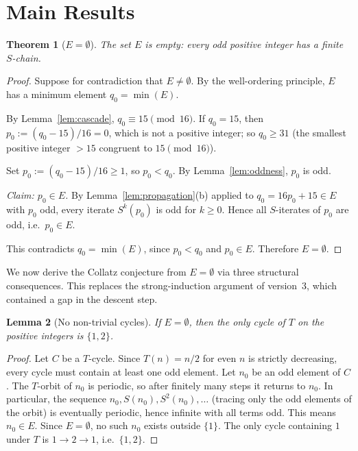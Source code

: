 \documentclass{amsart}
\newtheorem{theorem}{Theorem}[section]
\newtheorem{lemma}[theorem]{Lemma}
\theoremstyle{definition}
\theoremstyle{remark}
\begin{document}
\section{Main Results}
\label{sec:main}

\begin{theorem}[$E=\emptyset$]
\label{thm:empty}
The set $E$ is empty: every odd positive integer has a finite $S$-chain.
\end{theorem}

\begin{proof}
Suppose for contradiction that $E\ne\emptyset$.
By the well-ordering principle, $E$ has a minimum element
$q_0=\min(E)$.

By Lemma~\ref{lem:cascade}, $q_0\equiv 15\pmod{16}$.
If $q_0=15$, then $p_0:=(q_0-15)/16=0$, which is not a positive integer;
so $q_0\ge 31$ (the smallest positive integer $>15$ congruent to
$15\pmod{16}$).

Set $p_0:=(q_0-15)/16\ge 1$, so $p_0<q_0$.
By Lemma~\ref{lem:oddness}, $p_0$ is odd.

\medskip
\noindent\textit{Claim: $p_0\in E$.}
By Lemma~\ref{lem:propagation}(b) applied to $q_0=16p_0+15\in E$ with
$p_0$ odd, every iterate $S^k(p_0)$ is odd for $k\ge 0$.
Hence all $S$-iterates of $p_0$ are odd, i.e.\ $p_0\in E$.

This contradicts $q_0=\min(E)$, since $p_0<q_0$ and $p_0\in E$.
Therefore $E=\emptyset$.
\end{proof}

We now derive the Collatz conjecture from $E=\emptyset$ via three
structural consequences.
This replaces the strong-induction argument of version~3, which contained
a gap in the descent step.

\begin{lemma}[No non-trivial cycles]
\label{lem:nocycles}
If $E=\emptyset$, then the only cycle of $T$ on the positive integers is
$\{1,2\}$.
\end{lemma}

\begin{proof}
Let $C$ be a $T$-cycle.
Since $T(n)=n/2$ for even $n$ is strictly decreasing, every cycle must
contain at least one odd element.
Let $n_0$ be an odd element of $C$.
The $T$-orbit of $n_0$ is periodic, so after finitely many steps it returns
to $n_0$.
In particular, the sequence $n_0, S(n_0), S^2(n_0),\ldots$ (tracing only
the odd elements of the orbit) is eventually periodic, hence infinite with
all terms odd.
This means $n_0\in E$.
Since $E=\emptyset$, no such $n_0$ exists outside $\{1\}$.
The only cycle containing $1$ under $T$ is $1\to 2\to 1$, i.e.\ $\{1,2\}$.
\end{proof}
\end{document}
